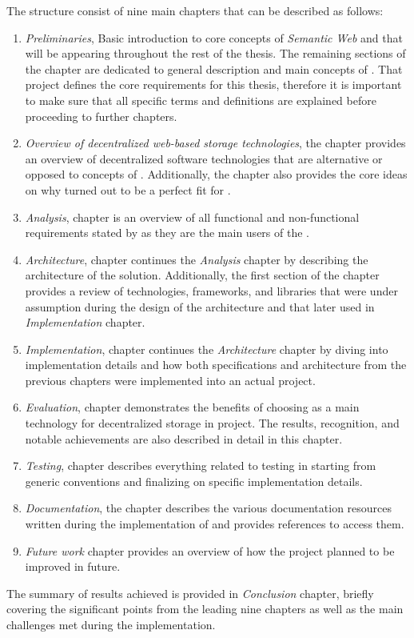 The structure consist of nine main chapters that can be described as follows:
\begin{enumerate}
    \item \textit{Preliminaries}, Basic introduction to core concepts of \textit{Semantic Web} and \solid{} that will be appearing throughout the rest of the thesis. The remaining sections of the chapter are dedicated to general description and main concepts of \lpa{}. That project defines the core requirements for this thesis, therefore it is important to make sure that all \lpa{} specific terms and definitions are explained before proceeding to further chapters.
    
    \item \textit{Overview of decentralized web-based storage technologies}, the chapter provides an overview of decentralized software technologies that are alternative or opposed to concepts of \solid{}. Additionally, the chapter also provides the core ideas on why \solid{} turned out to be a perfect fit for \lpa{}.

    \item \textit{Analysis}, chapter is an overview of all functional and non-functional requirements stated by \lpa{} as they are the main users of the \lpas{}.

    \item \textit{Architecture}, chapter continues the \textit{Analysis} chapter by describing the architecture of the solution. Additionally, the first section of the chapter provides a review of technologies, frameworks, and libraries that were under assumption during the design of the architecture and that later used in \textit{Implementation} chapter.  

    \item \textit{Implementation}, chapter continues the \textit{Architecture} chapter by diving into implementation details and how both specifications and architecture from the previous chapters were implemented into an actual project. 
    
    \item \textit{Evaluation}, chapter demonstrates the benefits of choosing \solid{} as a main technology for decentralized storage in \lpa{} project. The results, recognition, and notable achievements are also described in detail in this chapter.
    
    \item \textit{Testing}, chapter describes everything related to testing in \lpas{} starting from generic conventions and finalizing on specific implementation details.
    
    \item \textit{Documentation}, the chapter describes the various documentation resources written during the implementation of \lpa{} and provides references to access them.
     
     \item \textit{Future work} chapter provides an overview of how the project planned to be improved in future. 
\end{enumerate}

The summary of results achieved is provided in \textit{Conclusion} chapter, briefly covering the significant points from the leading nine chapters as well as the main challenges met during the implementation.